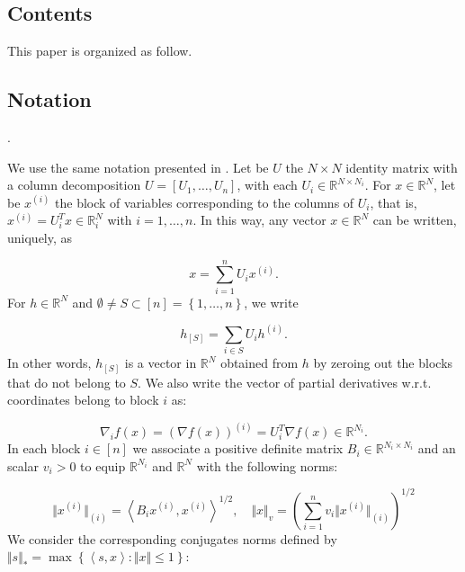 \documentclass{article}
\newcommand{\R}{\mathbb{R}}
\begin{document}
\subsection{Contents}

This paper is organized as follow. 

\subsection{Notation}. 

We use the same notation presented in \cite{Fercoq_Richtarik}. Let be $U$ the $N \times N$ identity matrix with a column decomposition $U = \left[ U_1,\ldots,U_n \right]$, with each $U_i \in \R^{N\times N_i}$.  For $x \in \R^N$, let be $x^{(i)}$ the block of variables corresponding to the columns of $U_i$, that is, $x^{(i)} = U_i^{T}x \in \R^N_i$ with $i = 1,\ldots,n$. In this way, any vector $x \in \R^N$ can be written, uniquely, as

\begin{equation}
	x = \sum_{i=1}^n U_ix^{(i)}.
\end{equation}
For $h \in \R^N$ and $\emptyset \neq S \subset [n] = \left\{ 1,\ldots,n \right\}$, we write

\begin{equation}
	h_{[S]} = \sum_{i\in S} U_ih^{(i)}.
\end{equation}
In other words, $h_{[S]}$ is a vector in $\R^N$ obtained from $h$ by zeroing out the blocks that do not belong to $S$. We also write the vector of partial derivatives w.r.t. coordinates belong to block $i$ as:

\begin{equation}
	\nabla_i f(x) = \left(\nabla f(x) \right)^{(i)} = U_i^{T} \nabla f(x) \in \R^{N_i}.
\end{equation}
In each block $i \in [n]$ we associate a positive definite matrix $B_i \in \R^{N_i \times N_i}$ and an scalar $v_i > 0$ to equip $\R^{N_i}$ and $\R^N$ with the following norms:

\begin{equation}
	\Vert x^{(i)} \Vert_{(i)} = \left<B_i x^{(i)}, x^{(i)} \right>^{1/2}, \quad \Vert x \Vert_v = \left(\sum_{i=1}^n v_i \Vert x^{(i)} \Vert_{(i)} \right)^{1/2}
\end{equation}
We consider the corresponding conjugates norms defined by $\Vert s \Vert_* = \max\left\{ \left<s,x \right>:\Vert x \Vert \leq 1 \right\}$:
\end{document}
